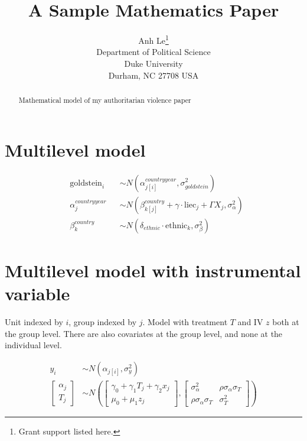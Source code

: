 \documentclass[12pt]{article}
\newcommand{\col}[1]{\left[\begin{matrix} #1 \end{matrix} \right]}
\begin{document}
\nocite{*}

\title{A Sample Mathematics Paper}

\author{Anh Le\thanks{Grant support listed here.} \\ 
Department of Political Science \\
Duke University \\
Durham, NC 27708 USA}

\maketitle

\begin{abstract}
  Mathematical model of my authoritarian violence paper
\end{abstract}

\section{Multilevel model}

\begin{align}
&\text{goldstein}_i &&\sim N(\alpha^{countryyear}_{j[i]}, \sigma^2_{goldstein}) \\
&\alpha_j^{countryyear} &&\sim N(\beta_{k[j]}^{country} + \gamma \cdot \text{liec}_j + \Gamma X_j, \sigma_{\alpha}^2) \\
&\beta_k^{country} &&\sim N(\delta_{ethnic} \cdot \text{ethnic}_k, \sigma_\beta^2) 
\end{align}


\section{Multilevel model with instrumental variable}

Unit indexed by $i$, group indexed by $j$. Model with treatment $T$ and IV $z$ both at the group level. There are also covariates at the group level, and none at the individual level.

\begin{align}
y_i &\sim N(\alpha_{j[i]}, \sigma_y^2) \\
\col{\alpha_j \\ T_j} &\sim 
N \left(
    \col{\gamma_0 + \gamma_1 T_j + \gamma_2 x_j\\\mu_0 + \mu_1 z_j} ,
    \left[
    \begin{matrix}
      \sigma^2_\alpha & \rho \sigma_\alpha \sigma_T \\
      \rho \sigma_\alpha \sigma_T & \sigma^2_T
    \end{matrix}
    \right]
\right)
\end{align}
\end{document}
